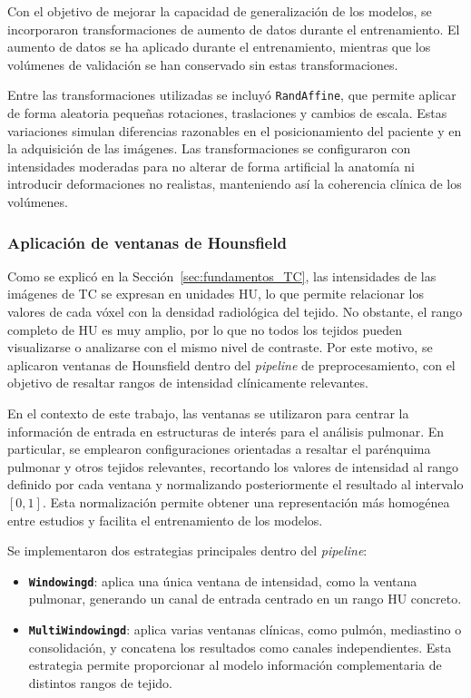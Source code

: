 Con el objetivo de mejorar la capacidad de generalización de los modelos, se incorporaron transformaciones de aumento de datos durante el entrenamiento. El aumento de datos se ha aplicado durante el entrenamiento, mientras que los volúmenes de validación se han conservado sin estas transformaciones.

Entre las transformaciones utilizadas se incluyó \texttt{RandAffine}, que permite aplicar de forma aleatoria pequeñas rotaciones, traslaciones y cambios de escala. Estas variaciones simulan diferencias razonables en el posicionamiento del paciente y en la adquisición de las imágenes. Las transformaciones se configuraron con intensidades moderadas para no alterar de forma artificial la anatomía ni introducir deformaciones no realistas, manteniendo así la coherencia clínica de los volúmenes.


\subsubsection{Aplicación de ventanas de Hounsfield}

Como se explicó en la Sección~\ref{sec:fundamentos_TC}, las intensidades de las imágenes de TC se expresan en unidades HU, lo que permite relacionar los valores de cada vóxel con la densidad radiológica del tejido. No obstante, el rango completo de HU es muy amplio, por lo que no todos los tejidos pueden visualizarse o analizarse con el mismo nivel de contraste. Por este motivo, se aplicaron ventanas de Hounsfield dentro del \textit{pipeline} de preprocesamiento, con el objetivo de resaltar rangos de intensidad clínicamente relevantes.

En el contexto de este trabajo, las ventanas se utilizaron para centrar la información de entrada en estructuras de interés para el análisis pulmonar. En particular, se emplearon configuraciones orientadas a resaltar el parénquima pulmonar y otros tejidos relevantes, recortando los valores de intensidad al rango definido por cada ventana y normalizando posteriormente el resultado al intervalo $[0,1]$. Esta normalización permite obtener una representación más homogénea entre estudios y facilita el entrenamiento de los modelos.

Se implementaron dos estrategias principales dentro del \textit{pipeline}:

\begin{itemize}
    \item \textbf{\texttt{Windowingd}}: aplica una única ventana de intensidad, como la ventana pulmonar, generando un canal de entrada centrado en un rango HU concreto.

    \item \textbf{\texttt{MultiWindowingd}}: aplica varias ventanas clínicas, como pulmón, mediastino o consolidación, y concatena los resultados como canales independientes. Esta estrategia permite proporcionar al modelo información complementaria de distintos rangos de tejido.
\end{itemize}

